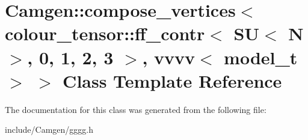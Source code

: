 \hypertarget{a00096}{}\section{Camgen\+:\+:compose\+\_\+vertices$<$ colour\+\_\+tensor\+:\+:ff\+\_\+contr$<$ S\+U$<$ N $>$, 0, 1, 2, 3 $>$, vvvv$<$ model\+\_\+t $>$ $>$ Class Template Reference}
\label{a00096}


The documentation for this class was generated from the following file\+:\begin{DoxyCompactItemize}
\item 
include/\+Camgen/gggg.\+h\end{DoxyCompactItemize}
